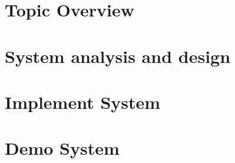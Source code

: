 \documentclass[12pt,a4paper,2sides]{report}
\begin{document}
\chapter{Topic Overview}
\newpage


\chapter{System analysis and design}
\newpage


\chapter{Implement System}
\newpage



\chapter{Demo System}
\newpage







\end{document}
